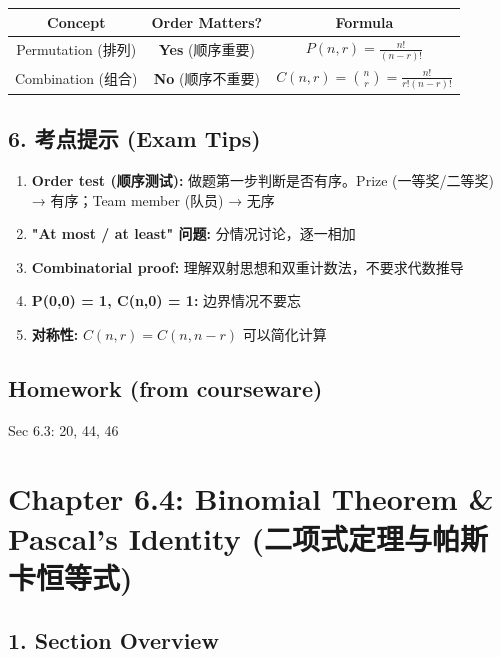 \documentclass[10pt,a4paper,openany]{ctexbook}
\theoremstyle{definition}
\theoremstyle{remark}
\begin{document}
\begin{center}
\begin{tabular}{ccc}
\hline
Concept & Order Matters? & Formula \\ \hline
Permutation (排列) & \textbf{Yes} (顺序重要) & $P(n, r) = \frac{n!}{(n-r)!}$ \\
Combination (组合) & \textbf{No} (顺序不重要) & $C(n, r) = \binom{n}{r} = \frac{n!}{r!(n-r)!}$ \\
\hline
\end{tabular}

\end{center}

\vspace{-2pt}

\subsection{6. 考点提示 (Exam Tips)}

\begin{enumerate}
\item \textbf{Order test (顺序测试):} 做题第一步判断是否有序。Prize (一等奖/二等奖) → 有序；Team member (队员) → 无序
\item \textbf{"At most / at least" 问题:} 分情况讨论，逐一相加
\item \textbf{Combinatorial proof:} 理解双射思想和双重计数法，不要求代数推导
\item \textbf{P(0,0) = 1, C(n,0) = 1:} 边界情况不要忘
\item \textbf{对称性:} $C(n, r) = C(n, n-r)$ 可以简化计算

\end{enumerate}

\vspace{-2pt}

\subsection{Homework (from courseware)}

Sec 6.3: 20, 44, 46

\newpage

\section{Chapter 6.4: Binomial Theorem \& Pascal's Identity (二项式定理与帕斯卡恒等式)}

\vspace{-2pt}

\subsection{1. Section Overview}
\end{document}
